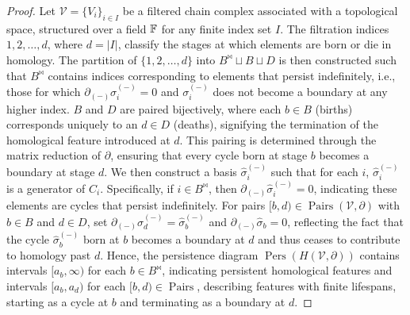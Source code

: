 \begin{proof}
	Let $\mathcal{V}= \{V_{i}\}_{i \in I}$ be a filtered chain complex associated with
	a topological space, structured over a field ${\mathbb{F}}$ for any finite index
	set $I$. The filtration indices ${1, 2, \ldots, d}$, where $d = \vert I \vert$,
	classify the stages at which elements are born or die in homology. The
	partition of $\{1, 2, \ldots, d\}$ into $B^{\Join} \sqcup B \sqcup D$ is then constructed such that $B^{\Join}$ contains indices corresponding to elements that persist indefinitely, i.e., those for which $\partial_{(-)}\sigma^{(-)}_{i} = 0$ and $\sigma^{(-)}_{i}$ does not become a boundary at any higher index. $B$ and $D$ are paired bijectively, where each $b \in B$ (births) corresponds uniquely to an $d \in D$ (deaths), signifying the termination of the homological feature introduced at $d$. This pairing is determined through the matrix reduction of $\partial$, ensuring that every cycle born at stage $b$ becomes a boundary at stage $d$. We then construct a basis ${\hat{\sigma}^{(-)}_i}$ such that for each $i$, $\hat{\sigma}^{(-)}
	_{i}$ is a generator of $C_{i}$. Specifically, if $i \in B^{\Join}$, then
	$\partial_{(-)}\hat{\sigma}^{(-)}_{i} = 0$, indicating these elements are cycles that persist
	indefinitely. For pairs $[b, d) \in \operatorname{Pairs}(\mathcal{V}, \partial)$
	with $b \in B$ and $d \in D$, set $\partial_{(-)}\hat{\sigma}^{(-)}_{d} = \hat{\sigma}^{(-)}_{b}$
	and $\partial_{(-)}\hat{\sigma}_{b} = 0$, reflecting the fact that the cycle
	$\hat{\sigma}^{(-)}_{b}$ born at $b$ becomes a boundary at $d$ and thus ceases to
	contribute to homology past $d$. Hence, the persistence diagram $\operatorname{Pers}(H(\mathcal{V}, \partial))$ contains
	intervals $[a_{b}, \infty)$ for each $b \in B^{\Join}$, indicating persistent
	homological features and intervals $[a_{b}, a_{d})$ for each
	$[b, d) \in \operatorname{Pairs}$, describing features with finite lifespans,
	starting as a cycle at $b$ and terminating as a boundary at $d$.
\end{proof}

